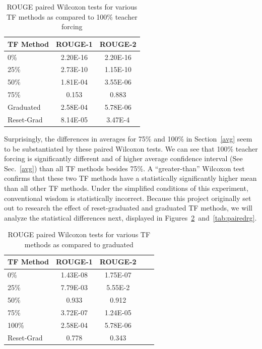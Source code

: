 \begin{table}[h]
  \centering
  \begin{tabular}{| l | c | c |}
    \hline
    TF Method & ROUGE-1 & ROUGE-2 \\
    \hline
    0\% & 2.20E-16 & 2.20E-16  \\
    25\% & 2.73E-10 & 1.15E-10  \\
    50\% & 1.81E-04 & 3.55E-06  \\
    75\% & 0.153 & 0.883  \\
    Graduated & 2.58E-04 & 5.78E-06  \\
    Reset-Grad & 8.14E-05 & 3.47E-4  \\
    \hline
  \end{tabular}
  \caption{ROUGE paired Wilcoxon tests for various TF methods as compared to 100\% teacher forcing}
  \label{tab:paired100}
\end{table}

Surprisingly, the differences in averages for 75\% and 100\% in Section~\ref{avg} seem to be substantiated by these paired Wilcoxon tests. We can see that 100\% teacher forcing is significantly different and of higher average confidence interval (See Sec.~\ref{avg}) than all TF methods besides 75\%. A ``greater-than'' Wilcoxon test confirms that these two TF methods have a statistically significantly higher mean than all other TF methods. Under the simplified conditions of this experiment, conventional wisdom is statistically incorrect. Because this project originally set out to research the effect of reset-graduated and graduated TF methods, we will analyze the statistical differences next, displayed in Figures~\ref{tab:pairedg}~and~\ref{tab:pairedrg}.

\begin{table}[h]
  \centering
  \begin{tabular}{| l | c | c | c | c |}
    \hline
    TF Method & ROUGE-1 & ROUGE-2 \\
    \hline
    0\% & 1.43E-08 & 1.75E-07  \\
    25\% & 7.79E-03 & 5.55E-2  \\
    50\% & 0.933 & 0.912  \\
    75\% & 3.72E-07 & 1.24E-05  \\
    100\% & 2.58E-04 & 5.78E-06  \\
    Reset-Grad & 0.778 & 0.343  \\
    \hline
  \end{tabular}
  \caption{ROUGE paired Wilcoxon tests for various TF methods as compared to graduated}
  \label{tab:pairedg}
\end{table}

